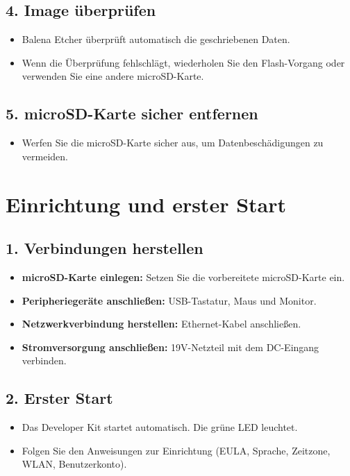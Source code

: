 \documentclass{article}
\begin{document}
\subsection{4. Image überprüfen}
\begin{itemize}
    \item Balena Etcher überprüft automatisch die geschriebenen Daten.
    \item Wenn die Überprüfung fehlschlägt, wiederholen Sie den Flash-Vorgang oder verwenden Sie eine andere microSD-Karte.
\end{itemize}

\subsection{5. microSD-Karte sicher entfernen}
\begin{itemize}
    \item Werfen Sie die microSD-Karte sicher aus, um Datenbeschädigungen zu vermeiden.
\end{itemize}

\section{Einrichtung und erster Start}

\subsection{1. Verbindungen herstellen}
\begin{itemize}
    \item \textbf{microSD-Karte einlegen:} Setzen Sie die vorbereitete microSD-Karte ein.
    \item \textbf{Peripheriegeräte anschließen:} USB-Tastatur, Maus und Monitor.
    \item \textbf{Netzwerkverbindung herstellen:} Ethernet-Kabel anschließen.
    \item \textbf{Stromversorgung anschließen:} 19V-Netzteil mit dem DC-Eingang verbinden.
\end{itemize}

\subsection{2. Erster Start}
\begin{itemize}
    \item Das Developer Kit startet automatisch. Die grüne LED leuchtet.
    \item Folgen Sie den Anweisungen zur Einrichtung (EULA, Sprache, Zeitzone, WLAN, Benutzerkonto).
\end{itemize}
\end{document}
